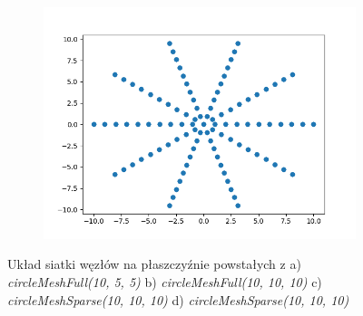 \begin{figure}
\begin{subfigure}{.5\textwidth}
  \caption{}
  \label{fig:sfig3}
\end{subfigure}%
\begin{subfigure}{.5\textwidth}
  \centering
  \includegraphics[width=.8\linewidth]{Zdjecia/5/siatka4}
  \caption{}
  \label{fig:sfig4}
\end{subfigure} 
\caption{Układ siatki węzłów na płaszczyźnie powstałych z a) \textit{circleMeshFull(10, 5, 5)} b) \textit{circleMeshFull(10, 10, 10)} c) \textit{circleMeshSparse(10, 10, 10)} d) \textit{circleMeshSparse(10, 10, 10)}}
\label{fig:siatka}
\end{figure}


